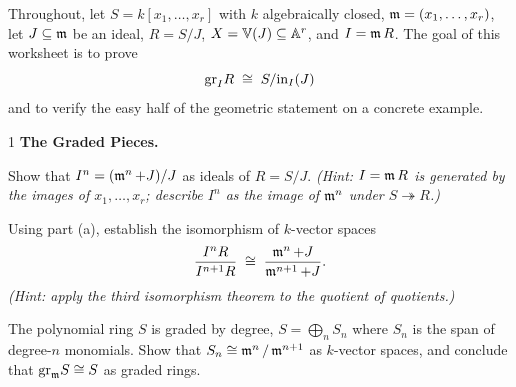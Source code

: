 \documentclass[12pt]{article}
\begin{document}
Throughout, let $S = k[x_1, \ldots, x_r]$ with $k$ algebraically closed,  $\operatorname{\mathfrak{m}} = (x_1, \ldots, x_r)$, let $J \subseteq \operatorname{\mathfrak{m}}$ be an ideal, $R = S/J$, $X = \mathbb V(J) \subseteq \mathbb A^r$, and $I = \operatorname{\mathfrak{m}} R$. The goal of this worksheet is to prove 
\[\text{gr}_I R \;\cong\; S/\text{in}_I(J)\]
and to verify the easy half of the geometric statement on a concrete example.

\begin{problem}{1} \textbf{The Graded Pieces.}

    \begin{enumalph}
        \item Show that $I^n = (\operatorname{\mathfrak{m}}^n + J)/J$ as ideals of $R = S/J$. 
        \emph{(Hint: $I = \operatorname{\mathfrak{m}} R$ is generated by the images of $x_1, \ldots, x_r$; 
        describe $I^n$ as the image of $\operatorname{\mathfrak{m}}^n$ under $S \twoheadrightarrow R$.)}

        \item Using part (a), establish the isomorphism of $k$-vector spaces
        \[\frac{I^n R}{I^{n+1} R} \;\cong\; \frac{\operatorname{\mathfrak{m}}^n + J}{\operatorname{\mathfrak{m}}^{n+1} + J}.\]
        \emph{(Hint: apply the third isomorphism theorem to the quotient of 
        quotients.)}

        \item The polynomial ring $S$ is graded by degree, $S = \bigoplus_n S_n$ 
        where $S_n$ is the span of degree-$n$ monomials. Show that 
        $S_n \cong \operatorname{\mathfrak{m}}^n/\operatorname{\mathfrak{m}}^{n+1}$ as $k$-vector spaces, and conclude that 
        $\text{gr}_{\operatorname{\mathfrak{m}}} S \cong S$ as graded rings. 
    \end{enumalph}
\end{problem}


\end{document}
